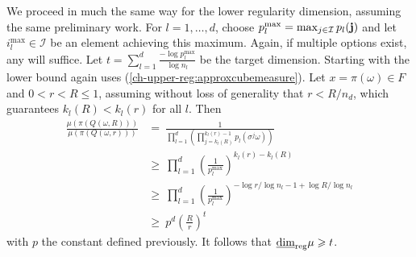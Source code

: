 We proceed in much the same way for the lower regularity dimension, assuming the same preliminary work. For $l=1,\ldots, d$, choose $p_l^{\textup{max}}=\max_{j\in \mathcal{I}} p_l(\mathbf{j})$ and let  $i_l^{\max} \in \mathcal{I}$ be an element achieving this maximum. Again, if multiple options exist, any will suffice. Let $t = \sum_{l=1}^d\frac{-\log p_l^{\text{max}}}{\log n_l}$ be the target dimension. Starting with the lower bound again uses (\ref{ch-upper-reg:approxcubemeasure}). Let $x = \pi(\omega) \in F$ and $0<r<R \le 1$, assuming without loss of generality that $r < R/ n_d$, which guarantees $k_l(R) < k_l(r)$ for all $l$. Then
\begin{align*}
\frac{\mu(\pi(Q(\omega,R)))}{\mu(\pi(Q(\omega,r)))}  & = \ \frac{1}{\prod_{l=1}^d\left(\prod_{j=k_l(R)}^{k_l(r)-1}p_l(\sigma^j \omega) \right)} \\
& \ge\  \prod_{l=1}^d\left( \frac{1}{p_l^{\text{max}}}\right)^{k_l(r)-k_l(R)} \\
& \ge\  \prod_{l=1}^d \left( \frac{1}{p_l^{\text{max}}}\right)^{-\log r/\log n_l -1 + \log R/\log n_l}  \\
& \ge \ p^{d} \left( \frac{R}{r} \right)^{t}
\end{align*}
with $p$ the constant defined previously. It follows that $\underline{\dim}_{\textup{reg}} \mu \geqslant t$.

